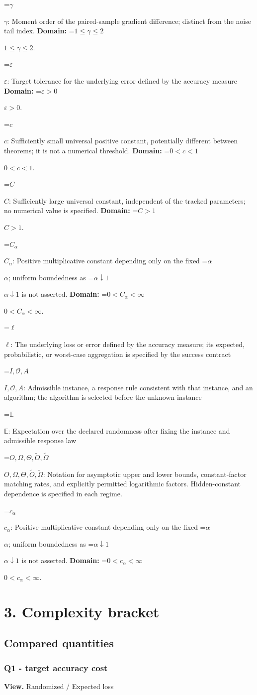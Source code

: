 \documentclass[10pt,a4paper]{article}
\newcommand{\AtlasMath}[1]{\par\begingroup\centering\setbox0=\hbox{$\displaystyle #1$}\ifdim\wd0>1.4\linewidth\typeout{ATLAS WIDE FORMULA: \the\wd0}\fi\ifdim\wd0>\linewidth\resizebox{\linewidth}{!}{\box0}\else\box0\fi\par\endgroup}
\newcommand{\AtlasInlineMath}[1]{\begingroup\setbox0=\hbox{$#1$}\ifdim\wd0>.4\linewidth\endgroup\AtlasMath{#1}\else\endgroup$#1$\fi}
\begin{document}
\AtlasInlineMath{\gamma}: Moment order of the paired-sample gradient difference; distinct from the noise tail index. \textbf{Domain:} \AtlasInlineMath{1\le\gamma\le2}.

\AtlasInlineMath{\varepsilon}: Target tolerance for the underlying error defined by the accuracy measure \textbf{Domain:} \AtlasInlineMath{\varepsilon>0}.

\AtlasInlineMath{c}: Sufficiently small universal positive constant, potentially different between theorems; it is not a numerical threshold. \textbf{Domain:} \AtlasInlineMath{0<c<1}.

\AtlasInlineMath{C}: Sufficiently large universal constant, independent of the tracked parameters; no numerical value is specified. \textbf{Domain:} \AtlasInlineMath{C>1}.

\AtlasInlineMath{C_\alpha}: Positive multiplicative constant depending only on the fixed \AtlasInlineMath{\alpha}; uniform boundedness as \AtlasInlineMath{\alpha\downarrow1} is not asserted. \textbf{Domain:} \AtlasInlineMath{0<C_\alpha<\infty}.

\AtlasInlineMath{\ell}: The underlying loss or error defined by the accuracy measure; its expected, probabilistic, or worst-case aggregation is specified by the success contract

\AtlasInlineMath{I,\mathcal{O},A}: Admissible instance, a response rule consistent with that instance, and an algorithm; the algorithm is selected before the unknown instance

\AtlasInlineMath{\mathbb{E}}: Expectation over the declared randomness after fixing the instance and admissible response law

\AtlasInlineMath{O,\Omega,\Theta,\widetilde{O},\widetilde\Omega}: Notation for asymptotic upper and lower bounds, constant-factor matching rates, and explicitly permitted logarithmic factors. Hidden-constant dependence is specified in each regime.

\AtlasInlineMath{c_\alpha}: Positive multiplicative constant depending only on the fixed \AtlasInlineMath{\alpha}; uniform boundedness as \AtlasInlineMath{\alpha\downarrow1} is not asserted. \textbf{Domain:} \AtlasInlineMath{0<c_\alpha<\infty}.

\section{3. Complexity bracket}
\subsection{Compared quantities}
\subsubsection{Q1 - target accuracy cost}
\textbf{View.} Randomized / Expected loss
\end{document}
